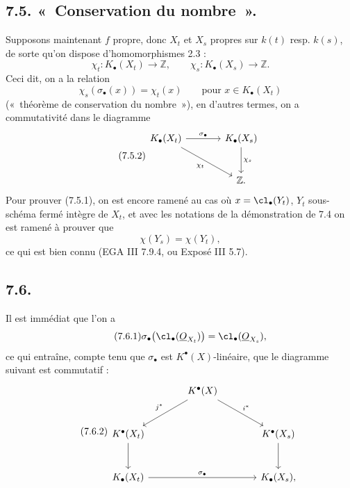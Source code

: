 
\subsection*{7.5. «~Conservation du nombre~».}
Supposons maintenant \(f\) propre, donc \(X_t\) et \(X_s\) propres sur \(k(t)\) resp. \(k(s)\), de sorte qu'on dispose d'homomorphismes 2.3 :
\[
  \chi_t:K_\bullet(X_t)\longrightarrow \mathbb Z,\qquad
  \chi_s:K_\bullet(X_s)\longrightarrow \mathbb Z .
\]
Ceci dit, on a la relation
\begin{equation}\tag{7.5.1}
  \chi_s(\sigma_\bullet(x))=\chi_t(x)\qquad\text{pour } x\in K_\bullet(X_t)
\end{equation}
(«~théorème de conservation du nombre~»), en d'autres termes, on a commutativité dans le diagramme
\begin{equation}\tag{7.5.2}
\begin{tikzcd}[column sep=large,row sep=large]
K_\bullet(X_t) \arrow[r,"\sigma_\bullet"] \arrow[dr,"\chi_t"'] &
K_\bullet(X_s) \arrow[d,"\chi_s"]\\
& \mathbb Z .
\end{tikzcd}
\end{equation}
Pour prouver (7.5.1), on est encore ramené au cas où \(x=\cl_\bullet(Y_t)\), \(Y_t\) sous-schéma fermé intègre de \(X_t\), et avec les notations de la démonstration de 7.4 on est ramené à prouver que
\[
  \chi(Y_s)=\chi(Y_t),
\]
ce qui est bien connu (EGA III 7.9.4, ou Exposé III 5.7).

\subsection*{7.6.}
Il est immédiat que l'on a
\begin{equation}\tag{7.6.1}
  \sigma_\bullet\bigl(\cl_\bullet(\underline{O}_{X_t})\bigr)=\cl_\bullet(\underline{O}_{X_s}),
\end{equation}
ce qui entraîne, compte tenu que \(\sigma_\bullet\) est \(K^{\bullet}(X)\)-linéaire, que le diagramme suivant est commutatif :
\begin{equation}\tag{7.6.2}
\begin{tikzcd}[column sep=large,row sep=large]
& K^{\bullet}(X) \arrow[dl,"j^*"'] \arrow[dr,"i^*"] &\\
K^{\bullet}(X_t) \arrow[d] && K^{\bullet}(X_s) \arrow[d]\\
K_\bullet(X_t) \arrow[rr,"\sigma_\bullet"] && K_\bullet(X_s),
\end{tikzcd}
\end{equation}
